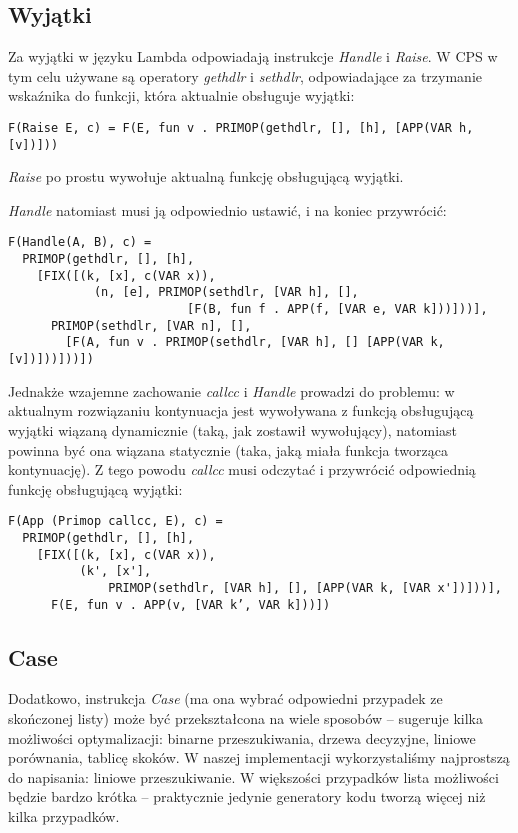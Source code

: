 \documentclass[11pt]{scrartcl}
\begin{document}
\subsection{Wyjątki}
Za wyjątki w języku  Lambda odpowiadają instrukcje \textit{Handle} i \textit{Raise}. W CPS w tym
celu używane są operatory \textit{gethdlr} i \textit{sethdlr}, odpowiadające za trzymanie
wskaźnika do funkcji, która aktualnie obsługuje wyjątki:
\begin{lstlisting}
F(Raise E, c) = F(E, fun v . PRIMOP(gethdlr, [], [h], [APP(VAR h, [v])]))
\end{lstlisting}
\textit{Raise} po prostu wywołuje aktualną funkcję obsługującą wyjątki.

\textit{Handle} natomiast musi ją odpowiednio ustawić, i na koniec przywrócić:
\begin{lstlisting}
F(Handle(A, B), c) =
  PRIMOP(gethdlr, [], [h],
    [FIX([(k, [x], c(VAR x)),
            (n, [e], PRIMOP(sethdlr, [VAR h], [],
                         [F(B, fun f . APP(f, [VAR e, VAR k]))]))],
      PRIMOP(sethdlr, [VAR n], [],
        [F(A, fun v . PRIMOP(sethdlr, [VAR h], [] [APP(VAR k, [v])]))]))])
\end{lstlisting}

Jednakże wzajemne zachowanie \textit{callcc} i \textit{Handle} prowadzi do problemu: w aktualnym rozwiązaniu
kontynuacja jest wywoływana z funkcją obsługującą wyjątki wiązaną dynamicznie
(taką, jak zostawił wywołujący), natomiast powinna być ona wiązana statycznie
(taka, jaką miała funkcja tworząca kontynuację). Z tego powodu \textit{callcc} musi
odczytać i przywrócić odpowiednią funkcję obsługującą wyjątki:
\begin{lstlisting}
F(App (Primop callcc, E), c) =
  PRIMOP(gethdlr, [], [h],
    [FIX([(k, [x], c(VAR x)),
          (k', [x'], 
              PRIMOP(sethdlr, [VAR h], [], [APP(VAR k, [VAR x'])]))],
      F(E, fun v . APP(v, [VAR k’, VAR k]))])
\end{lstlisting}

\subsection{Case}
Dodatkowo, instrukcja \textit{Case} (ma ona
wybrać odpowiedni przypadek ze skończonej listy) może być przekształcona na
wiele sposobów  -- \cite[Chapter 5.7: Case statements]{Appel5.7} sugeruje kilka
możliwości optymalizacji: binarne przeszukiwania, drzewa decyzyjne, liniowe
porównania, tablicę skoków. W naszej implementacji wykorzystaliśmy najprostszą
do napisania: liniowe przeszukiwanie. W większości przypadków lista możliwości
będzie bardzo krótka -- praktycznie jedynie generatory kodu tworzą więcej niż
kilka przypadków.
\end{document}
